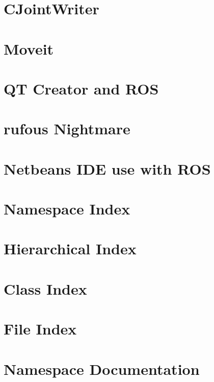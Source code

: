 \documentclass[twoside]{book}
\begin{document}
\chapter{C\-Joint\-Writer}
\label{md_markdown_JointWriter}
\hypertarget{md_markdown_JointWriter}{}

\chapter{Moveit}
\label{md_markdown_MoveitRvizNotes}
\hypertarget{md_markdown_MoveitRvizNotes}{}

\chapter{Q\-T Creator and R\-O\-S}
\label{md_markdown_QtCreatorWIthRos}
\hypertarget{md_markdown_QtCreatorWIthRos}{}

\chapter{rufous Nightmare}
\label{md_markdown_rufousdiskproblem}
\hypertarget{md_markdown_rufousdiskproblem}{}

\chapter{Netbeans I\-D\-E use with R\-O\-S}
\label{md_markdown_Running_Netbeans_without_Environment_setup_properly}
\hypertarget{md_markdown_Running_Netbeans_without_Environment_setup_properly}{}

\chapter{Namespace Index}

\chapter{Hierarchical Index}

\chapter{Class Index}

\chapter{File Index}

\chapter{Namespace Documentation}




\end{document}
